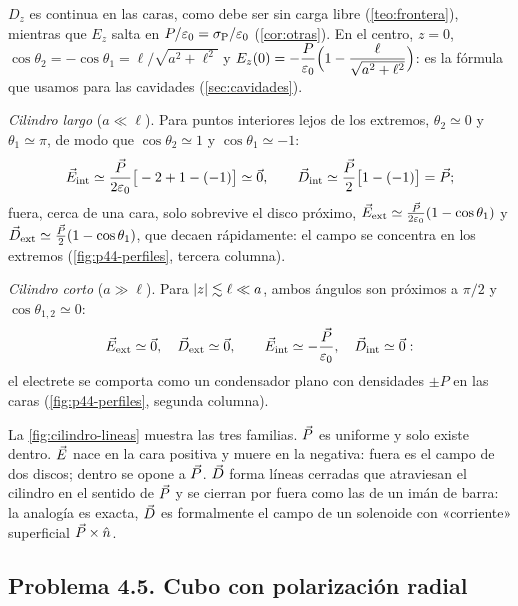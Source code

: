 \begin{observacion}[Comprobaciones]\label{obs:p44-comprobaciones}
$D_z$ es continua en las caras, como debe ser sin carga libre (\cref{teo:frontera}), mientras que $E_z$ salta en $P/\varepsilon_0=\sigma_{\mathrm P}/\varepsilon_0$ (\cref{cor:otras}). En el
centro, $z=0$, $\cos\theta_2=-\cos\theta_1=\ell/\sqrt{a^2+\ell^2}$ y $E_z(0)=-\dfrac{P}{\varepsilon_0}\Big(1-\dfrac{\ell}{\sqrt{a^2+\ell^2}}\Big)$: es la fórmula que usamos para las
cavidades (\cref{sec:cavidades}).
\end{observacion}

 \emph{Cilindro largo} ($a\ll\ell$). Para puntos interiores lejos de los extremos, $\theta_2\simeq0$ y $\theta_1\simeq\pi$, de modo que
$\cos\theta_2\simeq1$ y $\cos\theta_1\simeq-1$:
\[
  \vec E_{\mathrm{int}}\simeq\frac{\vec P}{2\varepsilon_0}\big[-2+1-(-1)\big]\simeq\vec 0,\qquad \vec D_{\mathrm{int}}\simeq\frac{\vec P}{2}\big[1-(-1)\big]=\vec P ;
\]
fuera, cerca de una cara, solo sobrevive el disco próximo, $\vec E_{\mathrm{ext}}\simeq\frac{\vec P}{2\varepsilon_0}(1-\cos\theta_1)$ y $\vec D_{\mathrm{ext}}\simeq\frac{\vec P}{2}(1-\cos\theta_1)$, que decaen
rápidamente: el campo se concentra en los extremos (\cref{fig:p44-perfiles}, tercera columna).

\emph{Cilindro corto} ($a\gg\ell$). Para $\left\lvert z\right\rvert\lesssim\ell\ll a$, ambos ángulos son próximos a $\pi/2$ y $\cos\theta_{1,2}\simeq0$:
\[
  \vec E_{\mathrm{ext}}\simeq\vec 0,\quad \vec D_{\mathrm{ext}}\simeq\vec 0,\qquad \vec E_{\mathrm{int}}\simeq-\frac{\vec P}{\varepsilon_0},\quad \vec D_{\mathrm{int}}\simeq\vec 0 :
\]
el electrete se comporta como un condensador plano con densidades $\pm P$ en las caras (\cref{fig:p44-perfiles}, segunda columna).

\begin{observacion}\label{obs:p44-lineas}
La \cref{fig:cilindro-lineas} muestra las tres familias. $\vec P$ es uniforme y solo existe dentro. $\vec E$ nace en la cara positiva y muere en la
negativa: fuera es el campo de dos discos; dentro se opone a $\vec P$. $\vec D$ forma líneas cerradas que atraviesan el cilindro en el sentido de $\vec P$
y se cierran por fuera como las de un imán de barra: la analogía es exacta, $\vec D$ es formalmente el campo de un solenoide con «corriente»
superficial $\vec P\times\hat n$.
\end{observacion}





\subsection{Problema 4.5. Cubo con polarización radial}\label{sec:p45}

